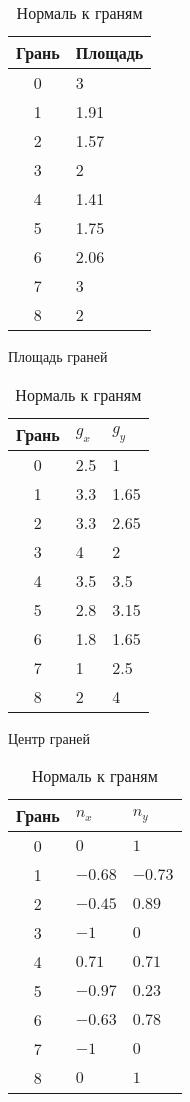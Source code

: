 \begin{table}[H]
\centering
    \begin{minipage}[t]{.3\linewidth}
        \centering
        \begin{tabular}[t]{c|l}
        Грань & Площадь\\
        \hline
        0 &  3      \\
        1 &  1.91   \\
        2 &  1.57   \\
        3 &  2      \\
        4 &  1.41   \\
        5 &  1.75   \\
        6 &  2.06   \\
        7 &  3      \\
        8 &  2      \\
        \end{tabular}
        \caption{\label{tab:fvm_tab_face_area} Площадь граней}
    \end{minipage}
    \;
    \begin{minipage}[t]{.3\linewidth}
        \centering
        \begin{tabular}[t]{c|l|l}
        Грань & $g_x$ & $g_y$ \\
        \hline
        0 &  2.5    &  1    \\
        1 &  3.3    &  1.65 \\
        2 &  3.3    &  2.65 \\
        3 &  4      &  2    \\
        4 &  3.5    &  3.5  \\
        5 &  2.8    &  3.15 \\
        6 &  1.8    &  1.65 \\
        7 &  1      &  2.5  \\
        8 &  2      &  4    \\
        \end{tabular}
        \caption{\label{tab:fvm_tab_face_center} Центр граней}
    \end{minipage}
    \;
    \begin{minipage}[t]{.3\linewidth}
      \centering
      \begin{tabular}[t]{c|l|l}
      Грань & $n_x$ & $n_y$ \\
      \hline
        0 & $ 0   $   & $ 1   $ \\
        1 & $-0.68$   & $-0.73$ \\
        2 & $-0.45$   & $ 0.89$ \\
        3 & $-1   $   & $ 0   $ \\
        4 & $ 0.71$   & $ 0.71$ \\
        5 & $-0.97$   & $ 0.23$ \\
        6 & $-0.63$   & $ 0.78$ \\
        7 & $-1   $   & $ 0   $ \\
        8 & $ 0   $   & $ 1   $ \\
      \end{tabular}
      \caption{\label{tab:fvm_tab_face_normal} Нормаль к граням}
    \end{minipage}
\end{table}

